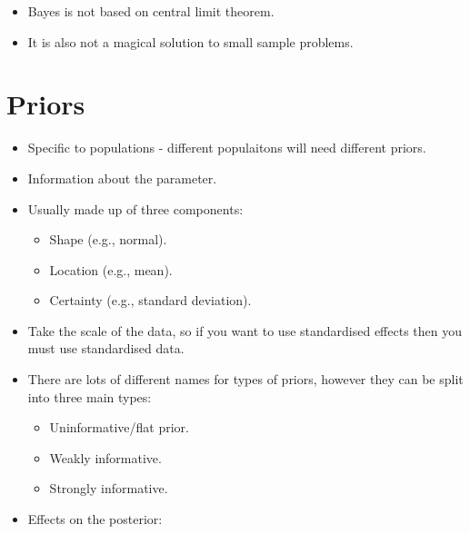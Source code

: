 \documentclass[
  a4paper,
  DIV=11,
  numbers=noendperiod]{scrreprt}
\providecommand{\tightlist}{%
  \setlength{\itemsep}{0pt}\setlength{\parskip}{0pt}}\usepackage{longtable,booktabs,array}
\begin{document}
\begin{itemize}
\begin{itemize}
    \begin{itemize}
    \tightlist
    \item
      Bayes is not based on central limit theorem.
    \item
      It is also not a magical solution to small sample problems.
    \end{itemize}
  \end{itemize}
\end{itemize}

\section{Priors}\label{priors}

\begin{itemize}
\tightlist
\item
  Specific to populations - different populaitons will need different
  priors.
\item
  Information about the parameter.
\item
  Usually made up of three components:

  \begin{itemize}
  \tightlist
  \item
    Shape (e.g., normal).
  \item
    Location (e.g., mean).
  \item
    Certainty (e.g., standard deviation).
  \end{itemize}
\item
  Take the scale of the data, so if you want to use standardised effects
  then you must use standardised data.
\item
  There are lots of different names for types of priors, however they
  can be split into three main types:

  \begin{itemize}
  \tightlist
  \item
    Uninformative/flat prior.
  \item
    Weakly informative.
  \item
    Strongly informative.
  \end{itemize}
\item
  Effects on the posterior:


\end{itemize}
\end{document}
